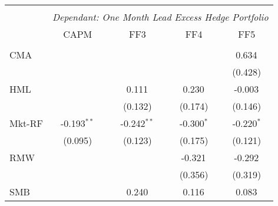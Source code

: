 \begin{table}[H] \centering
  \begin{tabular}{@{\extracolsep{5pt}}lcccc}
    \\[-1.8ex]\hline
    \hline                                                                                                                                                       \\[-1.8ex]
                      & \multicolumn{4}{c}{\textit{Dependant: One Month Lead Excess Hedge Portfolio}} \
    \cr \cline{2-5}
    \\[-1.8ex] & CAPM & FF3 & FF4 & FF5 \\
    \hline                                                                                                                                                       \\[-1.8ex]
    CMA               &                                                                                  &                   &                   & 0.634$^{}$    \\
                      &                                                                                  &                   &                   & (0.428)       \\
    HML               &                                                                                  & 0.111$^{}$        & 0.230$^{}$        & -0.003$^{}$   \\
                      &                                                                                  & (0.132)           & (0.174)           & (0.146)       \\
    Mkt-RF            & -0.193$^{**}$                                                                    & -0.242$^{**}$     & -0.300$^{*}$      & -0.220$^{*}$  \\
                      & (0.095)                                                                          & (0.123)           & (0.175)           & (0.121)       \\
    RMW               &                                                                                  &                   & -0.321$^{}$       & -0.292$^{}$   \\
                      &                                                                                  &                   & (0.356)           & (0.319)       \\
    SMB               &                                                                                  & 0.240$^{}$        & 0.116$^{}$        & 0.083$^{}$    \\

\end{tabular}
\end{table}
